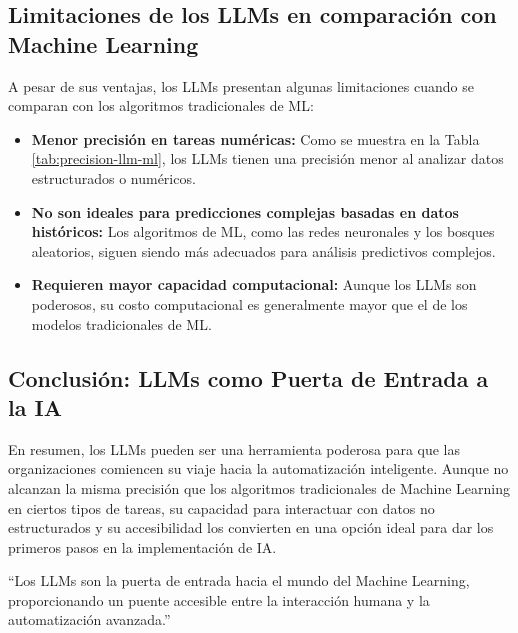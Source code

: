 \subsection{Limitaciones de los LLMs en comparación con Machine Learning}
A pesar de sus ventajas, los LLMs presentan algunas limitaciones cuando se comparan con los algoritmos tradicionales de ML:
\begin{itemize}
    \item \textbf{Menor precisión en tareas numéricas:} Como se muestra en la Tabla \ref{tab:precision-llm-ml}, los LLMs tienen una precisión menor al analizar datos estructurados o numéricos.
    \item \textbf{No son ideales para predicciones complejas basadas en datos históricos:} Los algoritmos de ML, como las redes neuronales y los bosques aleatorios, siguen siendo más adecuados para análisis predictivos complejos.
    \item \textbf{Requieren mayor capacidad computacional:} Aunque los LLMs son poderosos, su costo computacional es generalmente mayor que el de los modelos tradicionales de ML.
\end{itemize}

\subsection{Conclusión: LLMs como Puerta de Entrada a la IA}
En resumen, los LLMs pueden ser una herramienta poderosa para que las organizaciones comiencen su viaje hacia la automatización inteligente. Aunque no alcanzan la misma precisión que los algoritmos tradicionales de Machine Learning en ciertos tipos de tareas, su capacidad para interactuar con datos no estructurados y su accesibilidad los convierten en una opción ideal para dar los primeros pasos en la implementación de IA.

``Los LLMs son la puerta de entrada hacia el mundo del Machine Learning, proporcionando un puente accesible entre la interacción humana y la automatización avanzada.''
